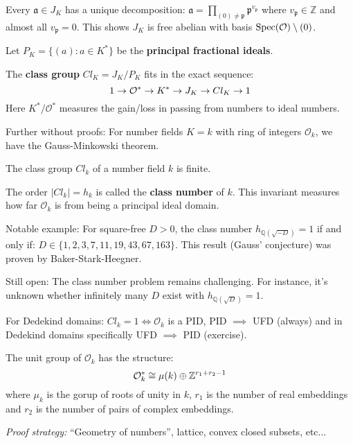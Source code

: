\begin{outline}
\0 \begin{corollary}
Every $\mathfrak{a} \in J_K$ has a unique decomposition:
$\mathfrak{a} = \prod_{(0)\neq \mathfrak{p}}\mathfrak{p}^{v_\mathfrak{p}}$
where $v_\mathfrak{p} \in \mathbb{Z}$ and almost all $v_\mathfrak{p} = 0$. This shows $J_K$ is free abelian with basis $\operatorname{Spec}(\mathcal{O}) \setminus {(0)}$.
\end{corollary}

\0 Let $P_K = \{(a) : a \in K^*\}$ be the \textbf{principal fractional ideals}.

\0 \begin{definition}
    The \textbf{class group} $Cl_K = J_K/P_K$ fits in the exact sequence: 
    $$1 \rightarrow \mathcal{O}^* \rightarrow K^* \rightarrow J_K \rightarrow Cl_K \rightarrow 1$$
    Here $K^*/\mathcal{O}^*$ measures the gain/loss in passing from numbers to ideal numbers.
\end{definition}

\1 Further without proofs: For number fields $K=k$ with ring of integers $\mathcal{O}_k$, we have the Gauss-Minkowski theorem.

\0 \begin{theorem}
The class group $Cl_k$ of a number field $k$ is finite.
\end{theorem}

\1 The order $|Cl_k| = h_k$ is called the \textbf{class number} of $k$. This invariant measures how far $\mathcal{O}_k$ is from being a principal ideal domain.

    \2 Notable example: For square-free $D > 0$, the class number $h_{\mathbb{Q}(\sqrt{-D})} = 1$ if and only if: $D \in \{1,2,3,7,11,19,43,67,163\}$. This result (Gauss' conjecture) was proven by Baker-Stark-Heegner.

    \2 Still open: The class number problem remains challenging. For instance, it's unknown whether infinitely many $D$ exist with $h_{\mathbb{Q}(\sqrt{D})} = 1$.

\1 For Dedekind domains: $Cl_k = 1 \iff \mathcal{O}_k$ is a PID, PID $\implies$ UFD (always) and in Dedekind domains specifically UFD $\implies$ PID (exercise).

\0 \begin{theorem}
    The unit group of $\mathcal{O}_k$ has the structure:
    $$\mathcal{O}^*_k \cong \mu(k)\oplus \mathbb{Z}^{r_1 + r_2 -1}$$ 
    where $\mu_k$ is the gorup of roots of unity in $k$, $r_1$ is the number of real embeddings and $r_2$ is the number of pairs of complex embeddings.
\end{theorem}
\textit{Proof strategy:} \enquote{Geometry of numbers}, lattice, convex closed subsets, etc...


\end{outline}
